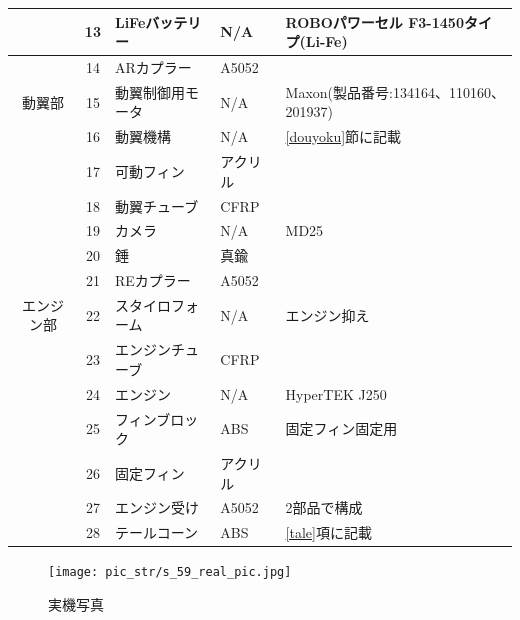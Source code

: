 \documentclass[a4paper,11pt,titlepage,uplatex]{jsarticle}
\begin{document}
\begin{longtable}[H]{cclll}
          & 13  & LiFeバッテリー & N/A   & ROBOパワーセル F3-1450タイプ(Li-Fe)      \\ \midrule
          & 14  & ARカプラー    & A5052 &                                  \\ \midrule
    動翼部   & 15  & 動翼制御用モータ  & N/A   & Maxon(製品番号:134164、110160、201937) \\
          & 16  & 動翼機構      & N/A   & \ref{douyoku}節に記載                \\
          & 17  & 可動フィン     & アクリル  &                                  \\
          & 18  & 動翼チューブ    & CFRP                                     \\
          & 19  & カメラ       & N/A   & MD25                             \\
          & 20  & 錘         & 真鍮    &                                  \\\midrule
          & 21  & REカプラー    & A5052 &                                  \\ \midrule
    エンジン部 & 22  & スタイロフォーム  & N/A   & エンジン抑え                           \\
          & 23  & エンジンチューブ  & CFRP                                     \\
          & 24  & エンジン      & N/A   & HyperTEK J250                    \\
          & 25  & フィンブロック   & ABS   & 固定フィン固定用                         \\
          & 26  & 固定フィン     & アクリル  &                                  \\
          & 27  & エンジン受け    & A5052 & 2部品で構成                           \\
          & 28  & テールコーン    & ABS   & \ref{tale}項に記載                   \\
    \bottomrule
\end{longtable}
\renewcommand{\arraystretch}{1.0}


\begin{figure}[H]
    \centering
    \texttt{[image: pic\_str/s\_59\_real\_pic.jpg]}
    \caption{実機写真}
    \label{s_real1}
\end{figure}
\end{document}
